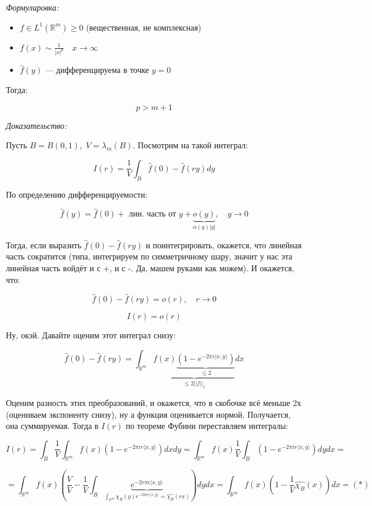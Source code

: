 \documentclass{article}
\def\dbl{\,\,}
\def\sk#1#2{\langle #1, #2 \rangle}
\begin{document}
\textit{Формулировка:}

\begin{itemize}
    \item $f \in L^1(\mathbb{R}^m) \ge 0$ (вещественная, не комплексная)
    \item $f(x) \sim \frac{1}{|x|^p} \quad x \rightarrow \infty$
    \item $\hat{f}(y)$ --- дифференцируема в точке $y  = 0$
\end{itemize}

Тогда: 

\[p > m + 1\]

\textit{Доказательство:}

Пусть $B = B(0, 1), \dbl V = \lambda_m(B)$. Посмотрим на такой интеграл:

\[I(r) = \frac{1}{V} \int_{B} \hat{f}(0) - \hat{f}(ry)dy\]

По определению дифференцируемости:

\[\hat{f}(y) = \hat{f}(0) + \text{ лин. часть от }y + \underbrace{o(y)}_{\alpha(y)|y|}, \quad y \rightarrow 0\]

Тогда, если выразить $\hat{f}(0) - \hat{f}(ry)$ и поинтегрировать, окажется, что линейная часть сократится (типа, интегрируем по симметричному шару, значит у нас эта линейная часть войдёт и с +, и с -. Да, машем руками как можем). И окажется, что:

\[\hat{f}(0) - \hat{f}(ry) = o(r), \quad r \rightarrow 0\]

\[I(r) = o(r)\]

Ну, окэй. Давайте оценим этот интеграл снизу:

\[\hat{f}(0) - \hat{f}(ry) = \int_{\mathbb{R}^m}\underbrace{f(x)\underbrace{(1 - e^{ - 2 \pi i \sk{x}{y}})}_{\le 2}}_{\le 2 ||f||_1} dx\]

Оценим разность этих преобразований, и окажется, что в скобочке всё меньше 2х (оцениваем экспоненту снизу), ну а функция оценивается нормой. Получается, она суммируемая. Тогда в $I(r)$ по теореме Фубини переставляем интегралы:

\[I(r) = \int_{B}\frac{1}{V} \int_{\mathbb{R}^m}f(x)(1 - e^{ - 2 \pi i r\sk{x}{y}}) dx dy = \int_{\mathbb{R}^m} f(x)\frac{1}{V}\int_{B}(1 - e^{ - 2 \pi i r\sk{x}{y}}) dy dx = \]

\[ = \int_{\mathbb{R}^m} f(x)\left(\frac{V}{V} - \frac{1}{V}\int_{B}\underbrace{e^{ - 2 r\pi i \sk{x}{y}}}_{\int_{\mathbb{R}^m} \chi_B(y)e^{ - 2 \pi ir \sk{x}{y}} = \widehat{\chi_B}(rx) }\right) dy dx = \int_{\mathbb{R}^m}f(x)\left(1 - \frac{1}{V}\widehat{\chi_B}(x)\right)dx = (*)\]
\end{document}
